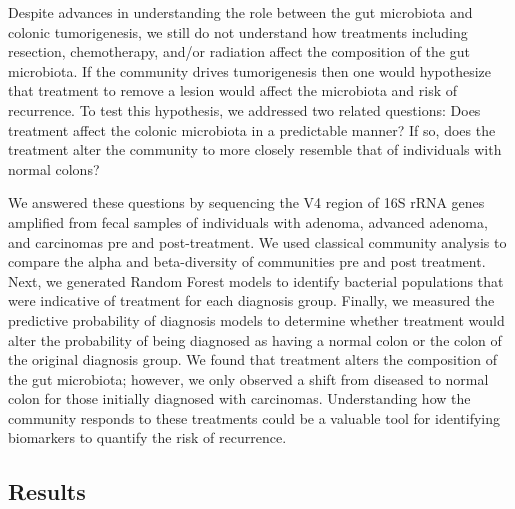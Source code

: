 \documentclass[12pt,]{article}
\begin{document}
Despite advances in understanding the role between the gut microbiota
and colonic tumorigenesis, we still do not understand how treatments
including resection, chemotherapy, and/or radiation affect the
composition of the gut microbiota. If the community drives tumorigenesis
then one would hypothesize that treatment to remove a lesion would
affect the microbiota and risk of recurrence. To test this hypothesis,
we addressed two related questions: Does treatment affect the colonic
microbiota in a predictable manner? If so, does the treatment alter the
community to more closely resemble that of individuals with normal
colons?

We answered these questions by sequencing the V4 region of 16S rRNA
genes amplified from fecal samples of individuals with adenoma, advanced
adenoma, and carcinomas pre and post-treatment. We used classical
community analysis to compare the alpha and beta-diversity of
communities pre and post treatment. Next, we generated Random Forest
models to identify bacterial populations that were indicative of
treatment for each diagnosis group. Finally, we measured the predictive
probability of diagnosis models to determine whether treatment would
alter the probability of being diagnosed as having a normal colon or the
colon of the original diagnosis group. We found that treatment alters
the composition of the gut microbiota; however, we only observed a shift
from diseased to normal colon for those initially diagnosed with
carcinomas. Understanding how the community responds to these treatments
could be a valuable tool for identifying biomarkers to quantify the risk
of recurrence.

\newpage

\subsection{Results}\label{results}
\end{document}

